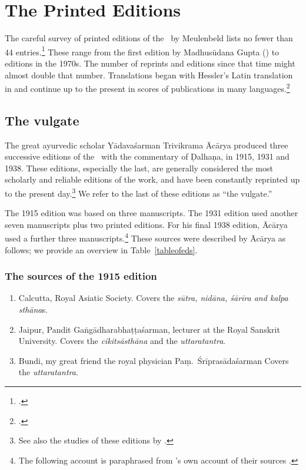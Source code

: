 \chapter{The Printed Editions}

The careful survey of printed editions of the \SS\ by Meulenbeld lists no fewer than 
44 entries.\footcite[IIB, 311--314]{meul-hist}  These range from the first edition 
by 
Madhusūdana Gupta (\citeyear{gupt-1835}) to editions in the 1970s. The 
number of 
reprints and editions since that time might almost double that number.  
Translations began with Hessler's Latin translation in \citeyear{hess-1855} and 
continue up to the present in scores of publications in many 
languages.\footcites[E.g.,][]{zysk-1984}[IIB, 314--315]{meul-hist}

\section{The vulgate}
\label{vulgate}

The great ayurvedic scholar Yādavaśarman Trivikrama Ācārya produced three
successive editions of the \SS\ with the commentary of Ḍalhaṇa, in 1915, 1931 and
1938.  These editions, especially the last, are generally considered the most
scholarly and reliable editions of the work, and have been constantly reprinted up
to the present day.\footnote{See also the studies of these editions by
    \textcites[\S 1.2]{kleb-2021b}[143--144]{wuja-2013}.}  We refer to the last of
    these editions as “the vulgate.”

The 1915 edition was based on three manuscripts.  The 1931 edition used another
seven manuscripts plus two printed editions.  For his final 1938 edition, Ācārya
used a further three manuscripts.\footnote{The following account is
paraphrased from \citeauthor{vulgate}'s own account of their sources
\citep[22]{vulgate}.}  These sources were described  by Ācārya as follows; we provide 
an overview in Table~\ref{tableofeds}.

\subsection{The sources of the 1915 edition}

\begin{enumerate}
    \item[1] Calcutta, Royal Asiatic Society.  Covers the \emph{sūtra, nidāna, śārīra 
        and 
        kalpa sthāna}s.  
    
    \item [2] Jaipur, Pandit Gaṅgādharabhaṭṭaśarman, lecturer at the Royal 
    Sanskrit University.  Covers the \emph{cikitsāsthāna} and the 
    \emph{uttaratantra}.
    
    \item [3]  Bundi, my great friend the royal physician Paṃ.\ Śrīprasādaśarman  
    Covers the \emph{uttaratantra}.
\end{enumerate}
%
